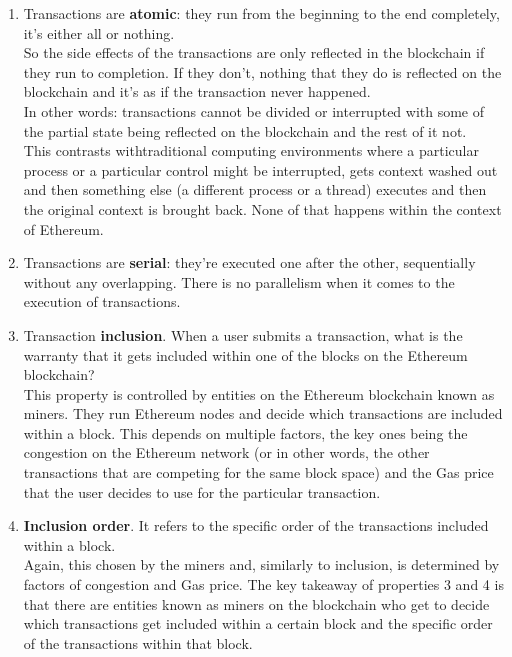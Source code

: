 \begin{enumerate}
\def\labelenumi{\arabic{enumi}.}
\item
  Transactions are \textbf{atomic}: they run from the beginning to the
  end completely, it's either all or nothing.\\

  So the side effects of the transactions are only reflected in the
  blockchain if they run to completion. If they don't, nothing that they
  do is reflected on the blockchain and it's as if the transaction never
  happened.\\

  In other words: transactions cannot be divided or interrupted with
  some of the partial state being reflected on the blockchain and the
  rest of it not.\\

  This contrasts withtraditional computing environments where a
  particular process or a particular control might be interrupted, gets
  context washed out and then something else (a different process or a
  thread) executes and then the original context is brought back. None
  of that happens within the context of Ethereum.
\item
  Transactions are \textbf{serial}: they're executed one after the
  other, sequentially without any overlapping. There is no parallelism
  when it comes to the execution of transactions.
\item
  Transaction \textbf{inclusion}. When a user submits a transaction,
  what is the warranty that it gets included within one of the blocks on
  the Ethereum blockchain?\\

  This property is controlled by entities on the Ethereum blockchain
  known as miners. They run Ethereum nodes and decide which transactions
  are included within a block. This depends on multiple factors, the key
  ones being the congestion on the Ethereum network (or in other words,
  the other transactions that are competing for the same block space)
  and the Gas price that the user decides to use for the particular
  transaction.
\item
  \textbf{Inclusion order}. It refers to the specific order of the
  transactions included within a block.\\

  Again, this chosen by the miners and, similarly to inclusion, is
  determined by factors of congestion and Gas price. The key takeaway of
  properties 3 and 4 is that there are entities known as miners on the
  blockchain who get to decide which transactions get included within a
  certain block and the specific order of the transactions within that
  block.
\end{enumerate}

